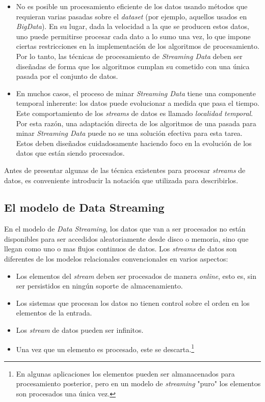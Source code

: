 \documentclass[a4paper,12pt, oneside]{article}
\begin{document}
\begin{itemize}
	\item No es posible un procesamiento eficiente de los datos usando métodos que requieran varias pasadas sobre el \textit{dataset} (por ejemplo, aquellos usados en \textit{BigData}). En su lugar, dada la velocidad a la que se producen estos datos, uno puede permitirse procesar cada dato a lo sumo una vez, lo que impone ciertas restricciones en la implementación de los algoritmos de procesamiento. Por lo tanto, las técnicas de procesamiento de \textit{Streaming Data} deben ser diseñadas de forma que los algoritmos cumplan su cometido con una única pasada por el conjunto de datos.
	\item En muchos casos, el proceso de minar \textit{Streaming Data} tiene una componente temporal inherente: los datos puede evolucionar a medida que pasa el tiempo. Este comportamiento de los \textit{streams} de datos es llamado \textit{localidad temporal}\cite{Aggarwal:2006:DSM:1196418}. Por esta razón, una adaptación directa de los algoritmos de una pasada para minar \textit{Streaming Data} puede no se una solución efectiva para esta tarea. Estos deben diseñados cuidadosamente haciendo foco en la evolución de los datos que están siendo procesados.
\end{itemize}

Antes de presentar algunas de las técnica existentes para procesar \textit{streams} de datos, es conveniente introducir la notación que utilizada para describirlos.

\subsection{El modelo de Data Streaming}
En el modelo de \textit{Data Streaming}, los datos que van a ser procesados no están disponibles para ser accedidos aleatoriamente desde disco o memoria, sino que llegan como uno o mas flujos continuos de datos. Los \textit{streams} de datos son diferentes de los modelos relacionales convencionales en varios aspectos: 
\begin{itemize}
	\item Los elementos del \textit{stream} deben ser procesados de manera \textit{online}, esto es, sin ser persistidos en ningún soporte de almacenamiento.
	\item Los sistemas que procesan los datos no tienen control sobre el orden en los elementos de la entrada.
	\item Los \textit{stream} de datos pueden ser infinitos.
	\item Una vez que un elemento es procesado, este se descarta.\footnote{En algunas aplicaciones los elementos pueden ser almanacenados para procesamiento posterior, pero en un modelo de \textit{streaming} "puro" los elementos son procesados una única vez.}
\end{itemize}
\end{document}
